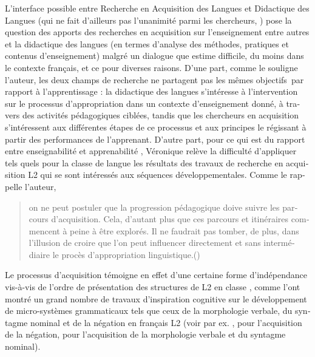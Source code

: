 \documentclass[output=paper]{langscibook}
\begin{document}
\begin{otherlanguage}{french}
\begin{sloppypar}
L’interface possible entre Recherche en Acquisition des Langues et Didactique des Langues (qui ne fait d’ailleurs pas l’unanimité parmi les chercheurs, \citealt{HousenPierrard2005, KangEtAl2019, Trévisiol-OkamuraKomur-Thilloy2011}) pose la question des apports des recherches en acquisition sur l’enseignement  entre autres et la didactique des langues (en termes d’analyse des méthodes, pratiques et contenus d’enseignement) malgré un dialogue que \citet{Véronique2005Interrelations} estime difficile, du moins dans le contexte français, et ce pour diverses raisons. D’une part, comme le souligne l’auteur, les deux champs de recherche ne partagent pas les mêmes objectifs~par rapport à l’apprentissage : la didactique des langues s’intéresse à l’intervention sur le processus d’appropriation dans un contexte d’enseignement donné, à travers des activités pédagogiques ciblées, tandis que les chercheurs en acquisition s’intéressent aux différentes étapes de ce processus et aux principes le régissant à partir des performances de l’apprenant. D’autre part, pour ce qui est du rapport entre enseignabilité et apprenabilité \citep{Pienemann1989}, Véronique relève la difficulté d'appliquer tels quels pour la classe de langue les résultats des travaux de recherche en acquisition L2 qui se sont intéressés aux séquences développementales. Comme le rappelle l’auteur, 
\begin{quote}
  on ne peut postuler que la progression pédagogique doive suivre les parcours d’acquisition. Cela, d’autant plus que ces parcours et itinéraires commencent à peine à être explorés. Il ne faudrait pas tomber, de plus, dans l’illusion de croire que l’on peut influencer directement et sans intermédiaire le procès d’appropriation linguistique.\hfill\hbox{(\citealt[18]{Véronique2005Interrelations})}
\end{quote} 
\end{sloppypar}

Le processus d’acquisition témoigne en effet d’une certaine forme d’indépendance vis-à-vis de l’ordre de présentation des structures de L2 en classe \citep{Krashen1981}, comme l’ont montré un grand nombre de travaux d’inspiration cognitive sur le développement de micro-systèmes grammaticaux tels que ceux de la morphologie verbale, du syntagme nominal et de la négation en français L2 (voir par ex. \citealt{MylesEtAl2002}, \citealt{Royer2005} pour l’acquisition de la négation, \citealt{Bergström1997, BartningSchlyter2004} pour l’acquisition de la morphologie verbale et du syntagme nominal).


\end{otherlanguage}
\end{document}
